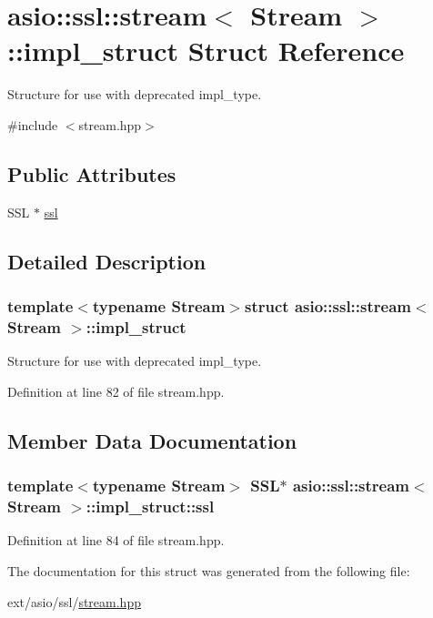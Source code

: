 \hypertarget{structasio_1_1ssl_1_1stream_1_1impl__struct}{}\section{asio\+:\+:ssl\+:\+:stream$<$ Stream $>$\+:\+:impl\+\_\+struct Struct Reference}
\label{structasio_1_1ssl_1_1stream_1_1impl__struct}


Structure for use with deprecated impl\+\_\+type.  




{\ttfamily \#include $<$stream.\+hpp$>$}

\subsection*{Public Attributes}
\begin{DoxyCompactItemize}
\item 
S\+S\+L $\ast$ \hyperlink{structasio_1_1ssl_1_1stream_1_1impl__struct_a8728d4aaaf77cb42ea676d8e8cc607e6}{ssl}
\end{DoxyCompactItemize}


\subsection{Detailed Description}
\subsubsection*{template$<$typename Stream$>$struct asio\+::ssl\+::stream$<$ Stream $>$\+::impl\+\_\+struct}

Structure for use with deprecated impl\+\_\+type. 

Definition at line 82 of file stream.\+hpp.



\subsection{Member Data Documentation}
\hypertarget{structasio_1_1ssl_1_1stream_1_1impl__struct_a8728d4aaaf77cb42ea676d8e8cc607e6}{}
\subsubsection[{ssl}]{\setlength{\rightskip}{0pt plus 5cm}template$<$typename Stream$>$ S\+S\+L$\ast$ {\bf asio\+::ssl\+::stream}$<$ Stream $>$\+::impl\+\_\+struct\+::ssl}\label{structasio_1_1ssl_1_1stream_1_1impl__struct_a8728d4aaaf77cb42ea676d8e8cc607e6}


Definition at line 84 of file stream.\+hpp.



The documentation for this struct was generated from the following file\+:\begin{DoxyCompactItemize}
\item 
ext/asio/ssl/\hyperlink{stream_8hpp}{stream.\+hpp}\end{DoxyCompactItemize}
